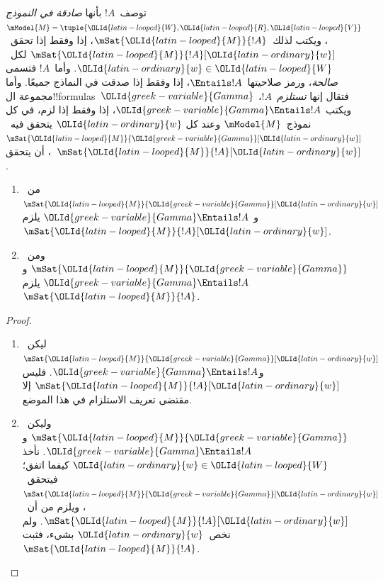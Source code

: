 \documentclass[../../../include/open-logic-section]{subfiles}
\begin{document}


\begin{defn}
  توصف~$!A$ بأنها \emph{صادقة في النموذج
    $\mModel{M}=\tuple{{\OLId{latin-looped}{W}},{\OLId{latin-looped}{R}},{\OLId{latin-looped}{V}}}$}، ويكتب لذلك~$\mSat{{\OLId{latin-looped}{M}}}{!A}$، إذا وفقط إذا
  تحقق~$\mSat{{\OLId{latin-looped}{M}}}{!A}[{\OLId{latin-ordinary}{w}}]$ لكل~${\OLId{latin-ordinary}{w}} \in {\OLId{latin-looped}{W}}$. وأما~$!A$ فتسمى \emph{صالحة}،
  ورمز صلاحيتها~$\Entails !A$، إذا وفقط إذا صدقت في النماذج جميعًا. وأما مجموعة
  ال!!{formula}s~${\OLId{greek-variable}{Gamma}}$ فتقال إنها \emph{تستلزم}~$!A$، ويكتب
  ${\OLId{greek-variable}{Gamma}} \Entails !A$، إذا وفقط إذا لزم، في كل نموذج~$\mModel{M}$ وعند كل
  ${\OLId{latin-ordinary}{w}}$ يتحقق فيه~$\mSat{{\OLId{latin-looped}{M}}}{{\OLId{greek-variable}{Gamma}}}[{\OLId{latin-ordinary}{w}}]$، أن يتحقق~$\mSat{{\OLId{latin-looped}{M}}}{!A}[{\OLId{latin-ordinary}{w}}]$.
\end{defn}

\begin{prop}
  \begin{enumerate}
  \item{} من~$\mSat{{\OLId{latin-looped}{M}}}{{\OLId{greek-variable}{Gamma}}}[{\OLId{latin-ordinary}{w}}]$ و
    ${\OLId{greek-variable}{Gamma}} \Entails !A$ يلزم~$\mSat{{\OLId{latin-looped}{M}}}{!A}[{\OLId{latin-ordinary}{w}}]$.
  \item{} ومن~$\mSat{{\OLId{latin-looped}{M}}}{{\OLId{greek-variable}{Gamma}}}$ و
    ${\OLId{greek-variable}{Gamma}} \Entails !A$ يلزم~$\mSat{{\OLId{latin-looped}{M}}}{!A}$.
  \end{enumerate}
\end{prop}

\begin{proof}
  \begin{enumerate}
  \item ليكن~$\mSat{{\OLId{latin-looped}{M}}}{{\OLId{greek-variable}{Gamma}}}[{\OLId{latin-ordinary}{w}}]$ و${\OLId{greek-variable}{Gamma}} \Entails !A$. فليس
    $\mSat{{\OLId{latin-looped}{M}}}{!A}[{\OLId{latin-ordinary}{w}}]$ إلا مقتضى تعريف الاستلزام في هذا الموضع.
  \item وليكن~$\mSat{{\OLId{latin-looped}{M}}}{{\OLId{greek-variable}{Gamma}}}$ و${\OLId{greek-variable}{Gamma}} \Entails !A$. نأخذ
    ${\OLId{latin-ordinary}{w}} \in {\OLId{latin-looped}{W}}$ كيفما اتفق؛ فيتحقق~$\mSat{{\OLId{latin-looped}{M}}}{{\OLId{greek-variable}{Gamma}}}[{\OLId{latin-ordinary}{w}}]$، ويلزم من
     أن~$\mSat{{\OLId{latin-looped}{M}}}{!A}[{\OLId{latin-ordinary}{w}}]$. ولم نخص~${\OLId{latin-ordinary}{w}}$
    بشيء، فثبت~$\mSat{{\OLId{latin-looped}{M}}}{!A}$.
  \end{enumerate}
\end{proof}
\end{document}
